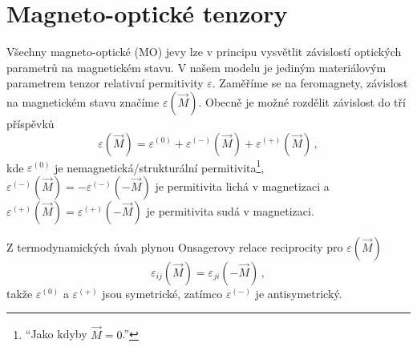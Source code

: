 \section{Magneto-optické tenzory}
\label{chap:magnetoopticke-tenzory}

Všechny magneto-optické (MO) jevy lze v principu vysvětlit závislostí optických parametrů na magnetickém stavu\cite{silberQuadraticMagnetoopticKerr2019a}.
V našem modelu je jediným materiálovým parametrem tenzor relativní permitivity $\varepsilon$.
Zaměříme se na feromagnety, závislost na magnetickém stavu značíme $\varepsilon(\vec{M})$.
Obecně je možné rozdělit závislost do tří příspěvků
\begin{equation}
    \varepsilon(\vec{M})=\varepsilon^{(0)} + \varepsilon^{(-)}(\vec{M}) + \varepsilon^{(+)}(\vec{M}) \,,
\end{equation}
kde $\varepsilon^{(0)}$ je nemagnetická/strukturální permitivita\footnote{``Jako kdyby $\vec{M}=0$.''},
$\varepsilon^{(-)}(\vec{M})=-\varepsilon^{(-)}(-\vec{M})$ je permitivita lichá v magnetizaci
a $\varepsilon^{(+)}(\vec{M})=\varepsilon^{(+)}(-\vec{M})$ je permitivita sudá v magnetizaci.

Z termodynamických úvah plynou Onsagerovy relace reciprocity\cite{onsagerReciprocalRelationsIrreversible1931a,onsagerReciprocalRelationsIrreversible1931} pro $\varepsilon(\vec{M})$
\begin{equation}
    \varepsilon_{ij}(\vec{M})=\varepsilon_{ji}(-\vec{M}) \,,
\end{equation}
takže $\varepsilon^{(0)}$ a $\varepsilon^{(+)}$ jsou symetrické, zatímco $\varepsilon^{(-)}$ je antisymetrický.


